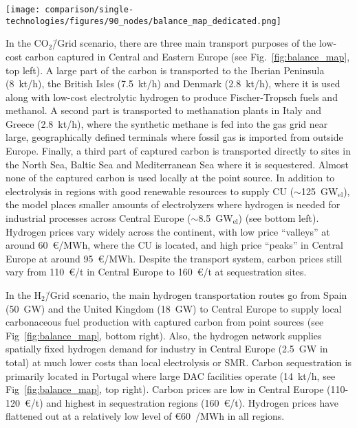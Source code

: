 \documentclass[twocolumn]{article}
\newcommand{\carbongrid}{CO$_2$\=/Grid}
\newcommand{\carbonscenario}{CO$_2$\=/Grid scenario}
\newcommand{\hydrogenscenario}{H$_2$\=/Grid scenario}
\begin{document}
\begin{figure*}[ht!]
    \centering
    \texttt{[image: comparison/single-technologies/figures/90\_nodes/balance\_map\_dedicated.png]}
    \caption{Average production, consumption, flows and prices of the carbon (top line) and hydrogen (bottom line) sectors in the \carbongrid{} (left) and the \hydrogenscenario{} (right). For each region, upper semicircles show the average production per technology, lower semicircles the consumption, and colors the average marginal prices. Lines and arrows show the interregional transportation. Carbon sequestration offshore is drawn in full circles.
    }
    \label{fig:balance_map}
\end{figure*}


In the \carbonscenario, there are three main transport purposes of the low-cost carbon captured in Central and Eastern Europe (see Fig.~\ref{fig:balance_map}, top left). A large part of the carbon is transported to the Iberian Peninsula (8~kt/h), the British Isles (7.5~kt/h) and Denmark (2.8~kt/h), where it is used along with low-cost electrolytic hydrogen to produce Fischer-Tropsch fuels and methanol. A second part is transported to methanation plants in Italy and Greece (2.8~kt/h), where the synthetic methane is fed into the gas grid near large, geographically defined terminals where fossil gas is imported from outside Europe. Finally, a third part of captured carbon is transported directly to sites in the North Sea, Baltic Sea and Mediterranean Sea where it is sequestered. Almost none of the captured carbon is used locally at the point source. In addition to electrolysis in regions with good renewable resources to supply CU ($\sim$125~GW$_\text{el}$), the model places smaller amounts of electrolyzers where hydrogen is needed for industrial processes across Central Europe ($\sim$8.5~GW$_\text{el}$) (see bottom left). Hydrogen prices vary widely across the continent, with low price ``valleys'' at around 60~€/MWh, where the CU is located, and high price ``peaks'' in Central Europe at around 95~€/MWh. Despite the transport system, carbon prices still vary from 110~€/t in Central Europe to 160~€/t at sequestration sites.

In the \hydrogenscenario{}, the main hydrogen transportation routes go from Spain (50~GW) and the United Kingdom (18~GW) to Central Europe to supply local carbonaceous fuel production with captured carbon from point sources (see Fig~\ref{fig:balance_map}, bottom right). Also, the hydrogen network supplies spatially fixed hydrogen demand for industry in Central Europe (2.5~GW in total) at much lower costs than local electrolysis or SMR. Carbon sequestration is primarily located in Portugal where large DAC facilities operate (14~kt/h, see Fig~\ref{fig:balance_map}, top right). Carbon prices are low in Central Europe (110-120~€/t) and highest in sequestration regions (160~€/t). Hydrogen prices have flattened out at a relatively low level of €60~/MWh in all regions.
\end{document}
